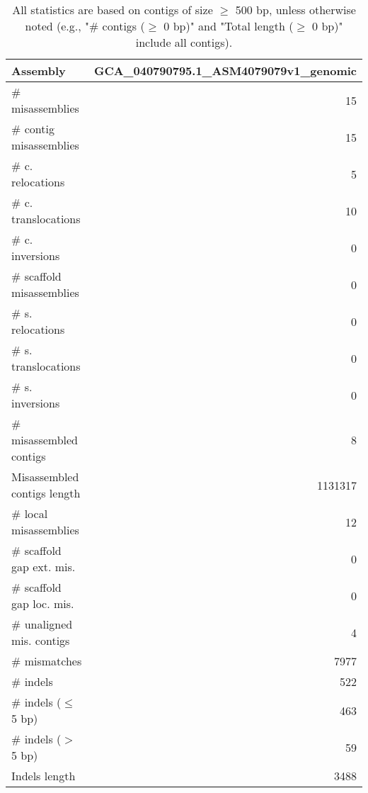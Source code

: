 \documentclass[12pt,a4paper]{article}
\begin{document}
\begin{table}[ht]
\begin{center}
\caption{All statistics are based on contigs of size $\geq$ 500 bp, unless otherwise noted (e.g., "\# contigs ($\geq$ 0 bp)" and "Total length ($\geq$ 0 bp)" include all contigs).}
\begin{tabular}{|l*{1}{|r}|}
\hline
Assembly & GCA\_040790795.1\_ASM4079079v1\_genomic \\ \hline
\# misassemblies & 15 \\ \hline
\hspace{2mm}\# contig misassemblies & 15 \\ \hline
\hspace{5mm}\# c. relocations & 5 \\ \hline
\hspace{5mm}\# c. translocations & 10 \\ \hline
\hspace{5mm}\# c. inversions & 0 \\ \hline
\hspace{2mm}\# scaffold misassemblies & 0 \\ \hline
\hspace{5mm}\# s. relocations & 0 \\ \hline
\hspace{5mm}\# s. translocations & 0 \\ \hline
\hspace{5mm}\# s. inversions & 0 \\ \hline
\# misassembled contigs & 8 \\ \hline
Misassembled contigs length & 1131317 \\ \hline
\# local misassemblies & 12 \\ \hline
\# scaffold gap ext. mis. & 0 \\ \hline
\# scaffold gap loc. mis. & 0 \\ \hline
\# unaligned mis. contigs & 4 \\ \hline
\# mismatches & 7977 \\ \hline
\# indels & 522 \\ \hline
\hspace{5mm}\# indels ($\leq$ 5 bp) & 463 \\ \hline
\hspace{5mm}\# indels ($>$ 5 bp) & 59 \\ \hline
Indels length & 3488 \\ \hline
\end{tabular}
\end{center}
\end{table}
\end{document}
